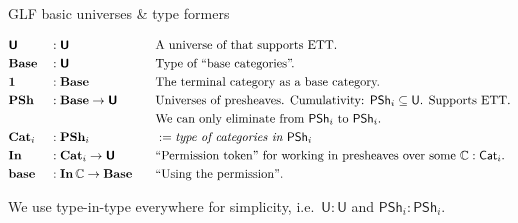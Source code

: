 \documentclass[dvipsnames,aspectratio=169]{beamer}
\newcommand{\mbb}[1]{\mathbb{#1}}
\newcommand{\mbf}[1]{\mathbf{#1}}
\newcommand{\bs}[1]{\boldsymbol{#1}}
\newcommand{\U}{\mathsf{U}}
\newcommand{\PSh}{\mathsf{PSh}}
\newcommand{\Cat}{\mathsf{Cat}}
\newcommand{\bBase}{\mathbf{Base}}
\newcommand{\bIn}{\mathbf{In}}
\newcommand{\bPSh}{\mathbf{PSh}}
\newcommand{\bCat}{\mathbf{Cat}}
\newcommand{\bbase}{\mathbf{base}}
\newcommand{\bU}{\bs{\U}}
\newcommand{\mbbC}{\mbb{C}}
\begin{document}
\begin{frame}{GLF basic universes \& type formers}

\begin{block}{}
\vspace{-1em}
\begin{alignat*}{3}
  & \bU     && : \bU           \hspace{6em}&& \text{A universe of that supports ETT.}\\
  & \bBase  && : \bU                 && \text{Type of ``base categories''.} \\
  & \mbf{1} && : \bBase                && \text{The terminal category as a base category.} \\
  & \bPSh   && : \bBase \to \bU      && \text{Universes of presheaves. Cumulativity: $\PSh_i \subseteq \U$. Supports ETT.}\\
  &        &&                          && \text{We can only eliminate from $\PSh_i$ to $\PSh_i$.} \\
  & \bCat_i && : \bPSh_i               && := \text{\emph{type of categories in $\PSh_i$}} \\
  & \bIn    &&: \bCat_i \to \bU      && \text{``Permission token'' for working in presheaves over some $\mbbC : \Cat_i$.} \\
  & \bbase  &&: \bIn\,\mbbC \to \bBase     && \text{``Using the permission''}.
\end{alignat*}
\end{block}
\vspace{1em}

{\small We use type-in-type everywhere for simplicity, i.e.\ $\U : \U$ and $\PSh_i : \PSh_i$.}

\end{frame}
\end{document}
